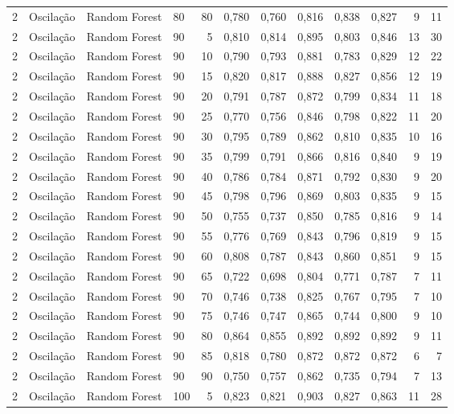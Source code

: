 \begin{longtable}{ccclrrrrrrrr}
2 & Oscilação & Random Forest & 80 & 80 & 0,780 & 0,760 & 0,816 & 0,838 & 0,827 & 9 & 11 \\
2 & Oscilação & Random Forest & 90 & 5 & 0,810 & 0,814 & 0,895 & 0,803 & 0,846 & 13 & 30 \\
2 & Oscilação & Random Forest & 90 & 10 & 0,790 & 0,793 & 0,881 & 0,783 & 0,829 & 12 & 22 \\
2 & Oscilação & Random Forest & 90 & 15 & 0,820 & 0,817 & 0,888 & 0,827 & 0,856 & 12 & 19 \\
2 & Oscilação & Random Forest & 90 & 20 & 0,791 & 0,787 & 0,872 & 0,799 & 0,834 & 11 & 18 \\
2 & Oscilação & Random Forest & 90 & 25 & 0,770 & 0,756 & 0,846 & 0,798 & 0,822 & 11 & 20 \\
2 & Oscilação & Random Forest & 90 & 30 & 0,795 & 0,789 & 0,862 & 0,810 & 0,835 & 10 & 16 \\
2 & Oscilação & Random Forest & 90 & 35 & 0,799 & 0,791 & 0,866 & 0,816 & 0,840 & 9 & 19 \\
2 & Oscilação & Random Forest & 90 & 40 & 0,786 & 0,784 & 0,871 & 0,792 & 0,830 & 9 & 20 \\
2 & Oscilação & Random Forest & 90 & 45 & 0,798 & 0,796 & 0,869 & 0,803 & 0,835 & 9 & 15 \\
2 & Oscilação & Random Forest & 90 & 50 & 0,755 & 0,737 & 0,850 & 0,785 & 0,816 & 9 & 14 \\
2 & Oscilação & Random Forest & 90 & 55 & 0,776 & 0,769 & 0,843 & 0,796 & 0,819 & 9 & 15 \\
2 & Oscilação & Random Forest & 90 & 60 & 0,808 & 0,787 & 0,843 & 0,860 & 0,851 & 9 & 15 \\
2 & Oscilação & Random Forest & 90 & 65 & 0,722 & 0,698 & 0,804 & 0,771 & 0,787 & 7 & 11 \\
2 & Oscilação & Random Forest & 90 & 70 & 0,746 & 0,738 & 0,825 & 0,767 & 0,795 & 7 & 10 \\
2 & Oscilação & Random Forest & 90 & 75 & 0,746 & 0,747 & 0,865 & 0,744 & 0,800 & 9 & 10 \\
2 & Oscilação & Random Forest & 90 & 80 & 0,864 & 0,855 & 0,892 & 0,892 & 0,892 & 9 & 11 \\
2 & Oscilação & Random Forest & 90 & 85 & 0,818 & 0,780 & 0,872 & 0,872 & 0,872 & 6 & 7 \\
2 & Oscilação & Random Forest & 90 & 90 & 0,750 & 0,757 & 0,862 & 0,735 & 0,794 & 7 & 13 \\
2 & Oscilação & Random Forest & 100 & 5 & 0,823 & 0,821 & 0,903 & 0,827 & 0,863 & 11 & 28 \\

\end{longtable}
